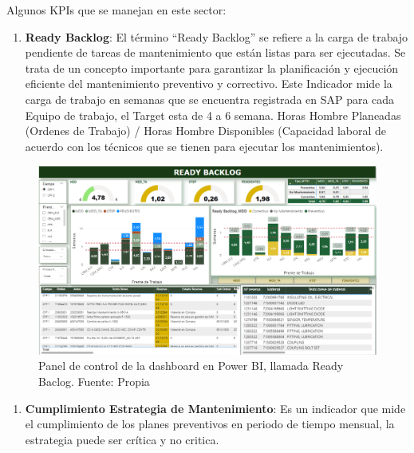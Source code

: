 \documentclass[
  11pt,
  bookmarksnumbered]{article}
\providecommand{\tightlist}{%
  \setlength{\itemsep}{0pt}\setlength{\parskip}{0pt}}
\begin{document}
Algunos KPIs que se manejan en este sector:

\begin{enumerate}
\def\labelenumi{\arabic{enumi}.}
\tightlist
\item
  \textbf{Ready Backlog}: El término ``Ready Backlog'' se refiere a la carga de trabajo pendiente de tareas de mantenimiento que están listas para ser ejecutadas. Se trata de un concepto importante para garantizar la planificación y ejecución eficiente del mantenimiento preventivo y correctivo. Este Indicador mide la carga de trabajo en semanas que se encuentra registrada en SAP para cada Equipo de trabajo, el Target esta de 4 a 6 semana. Horas Hombre Planeadas (Ordenes de Trabajo) / Horas Hombre Disponibles (Capacidad laboral de acuerdo con los técnicos que se tienen para ejecutar los mantenimientos).
\end{enumerate}

\begin{figure}

{\centering \includegraphics[width=5.98in]{media/image2} 

}

\caption{Panel de control de la dashboard en Power BI, llamada Ready Baclog. Fuente: Propia}\label{fig:unnamed-chunk-1}
\end{figure}

\begin{enumerate}
\def\labelenumi{\arabic{enumi}.}
\setcounter{enumi}{1}
\tightlist
\item
  \textbf{Cumplimiento Estrategia de Mantenimiento}: Es un indicador que mide el cumplimiento de los planes preventivos en periodo de tiempo mensual, la estrategia puede ser crítica y no critica.
\end{enumerate}
\end{document}
